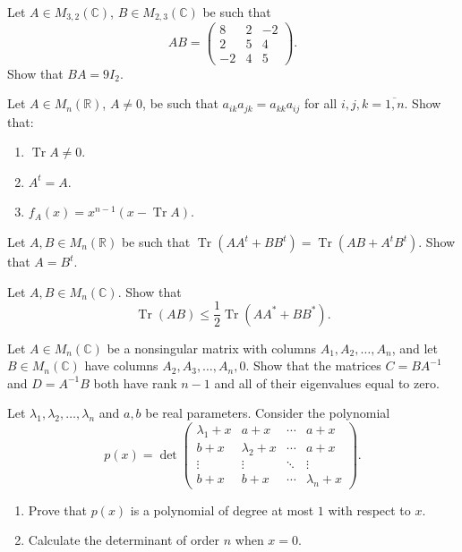 \documentclass[12pt]{article}
\begin{document}
\begin{problem}
Let $A \in M_{3,2}(\mathbb{C})$, $B \in M_{2,3}(\mathbb{C})$ be such that
$$AB = \begin{pmatrix} 8 & 2 & -2 \\ 2 & 5 & 4 \\ -2 & 4 & 5 \end{pmatrix}.$$
Show that $BA = 9 I_2$.
\end{problem}

\begin{problem}
Let $A \in M_n(\mathbb{R})$, $A \neq 0$, be such that $a_{ik} a_{jk} = a_{kk} a_{ij}$ for all $i,j,k = \overline{1,n}$. Show that:
\begin{enumerate}[label=(\alph*)]
\item $\operatorname{Tr} A \neq 0$.
\item $A^t = A$.
\item $f_A(x) = x^{n-1}(x - \operatorname{Tr} A)$.
\end{enumerate}
\end{problem}

\begin{problem}
Let $A, B \in M_n(\mathbb{R})$ be such that $\operatorname{Tr}(AA^t + BB^t) = \operatorname{Tr}(AB + A^tB^t)$. Show that $A = B^t$.
\end{problem}

\begin{problem}
Let $A, B \in M_n(\mathbb{C})$. Show that
$$\operatorname{Tr}(AB) \le \frac{1}{2}\operatorname{Tr}(AA^* + BB^*).$$
\end{problem}

\begin{problem}
Let $A \in M_n(\mathbb{C})$ be a nonsingular matrix with columns $A_1, A_2, \ldots, A_n$, and let $B \in M_n(\mathbb{C})$ have columns $A_2, A_3, \ldots, A_n, 0$. Show that the matrices $C = BA^{-1}$ and $D = A^{-1}B$ both have rank $n-1$ and all of their eigenvalues equal to zero.
\end{problem}

\begin{problem}
Let $\lambda_1,\lambda_2,\dots,\lambda_n$ and $a,b$ be real parameters. Consider the polynomial
\[
p(x) = \det\begin{pmatrix}
\lambda_1+x & a+x & \cdots & a+x\\
b+x & \lambda_2+x & \cdots & a+x\\
\vdots & \vdots & \ddots & \vdots\\
b+x & b+x & \cdots & \lambda_n+x
\end{pmatrix}.
\]
\begin{enumerate}[label=(\alph*)]
\item Prove that $p(x)$ is a polynomial of degree at most $1$ with respect to $x$.
\item Calculate the determinant of order $n$ when $x=0$.
\end{enumerate}
\end{problem}
\end{document}
